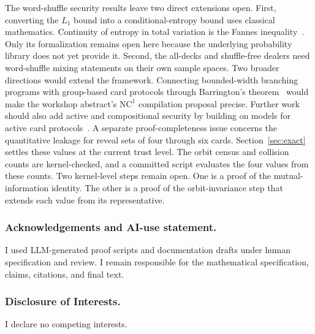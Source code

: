 \documentclass[runningheads]{llncs}
\begin{document}
The word-shuffle security results leave two direct extensions open. First,
converting the $L_1$ bound into a conditional-entropy bound uses classical
mathematics. Continuity of entropy in total variation is the Fannes
inequality~\cite{Fannes1973,CsiszarKorner2011}. Only its formalization remains
open here because the underlying probability library does not yet provide it.
Second, the all-decks and shuffle-free dealers need word-shuffle mixing
statements on their own sample spaces. Two broader directions would extend the
framework. Connecting bounded-width branching programs with group-based card
protocols through Barrington's theorem~\cite{Barrington1989,DvorakKoucky2021}
would make the workshop abstract's $\mathrm{NC}^1$ compilation proposal
precise. Further work should also add active and compositional security by
building on models for active card protocols~\cite{KochFUN2021}. A separate
proof-completeness issue concerns the quantitative leakage for reveal sets of
four through six cards. Section~\ref{sec:exact} settles these values at the
current trust level. The orbit census and collision counts are kernel-checked,
and a committed script evaluates the four values from these counts. Two
kernel-level steps remain open. One is a proof of the mutual-information
identity. The other is a proof of the orbit-invariance step that extends each
value from its representative.

\subsubsection*{Acknowledgements and AI-use statement.}

I used LLM-generated proof scripts and documentation drafts under human
specification and review. I remain responsible for the mathematical
specification, claims, citations, and final text.

\subsubsection*{Disclosure of Interests.}

I declare no competing interests.



\end{document}
